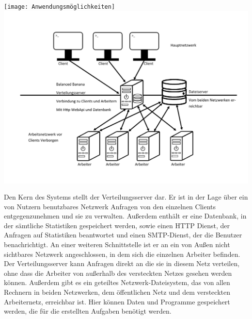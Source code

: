 \documentclass[a4paper,12pt]{article}
\begin{document}
\texttt{[image: Anwendungsmöglichkeiten]}
\includegraphics[width=\paperwidth]{Systemmodelle/Systemaufbau}

Den Kern des Systems stellt der Verteilungsserver dar. Er ist in der Lage über ein von Nutzern benutzbares Netzwerk Anfragen von den einzelnen Clients entgegenzunehmen und sie zu verwalten.
Außerdem enthält er eine Datenbank, in der sämtliche Statistiken gespeichert werden, sowie einen HTTP Dienst, der Anfragen auf Statistiken beantwortet und einen SMTP-Dienst, der die Benutzer benachrichtigt. An einer weiteren Schnittstelle ist er an ein von Außen nicht sichtbares Netzwerk angeschlossen, in dem sich die einzelnen Arbeiter befinden. Der Verteilungsserver kann Anfragen direkt an die sie in diesem Netz verteilen, ohne dass die Arbeiter von außerhalb des versteckten Netzes gesehen werden können. Außerdem gibt es ein geteiltes Netzwerk-Dateisystem, das von allen Rechnern in beiden Netzwerken, dem öffentlichen Netz und dem versteckten Arbeiternetz, erreichbar ist. Hier können Daten und Programme gespeichert werden, die für die erstellten Aufgaben benötigt werden.


\clearpage
\end{document}
